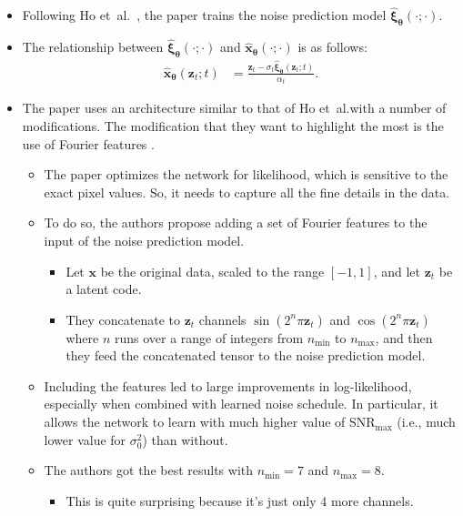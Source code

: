\documentclass[10pt]{article}
\newcommand{\ve}[1]{\mathbf{#1}}
\newcommand{\ves}[1]{\boldsymbol{#1}}
\newcommand{\etal}{{et~al.}}
\newcommand{\SNR}{\mathrm{SNR}}
\begin{document}
\begin{itemize}
  \item Following Ho \etal~\cite{Ho:2020}, the paper trains the noise prediction model $\hat{\ves{\xi}}_{\ves{\theta}}(\cdot; \cdot)$.
  
  \item The relationship between $\hat{\ves{\xi}}_{\ves{\theta}}(\cdot; \cdot)$ and $\hat{\ve{x}}_{\ves{\theta}}(\cdot; \cdot)$ is as follows:
  \begin{align*}
    \hat{\ve{x}}_{\ves{\theta}}(\ve{z}_t; t)
    &= \frac{\ve{z}_t - \sigma_t \hat{\ves{\xi}}_{\ves{\theta}}(\ve{z}_t; t) }{\alpha_t}.
  \end{align*}

  \item The paper uses an architecture similar to that of Ho \etal with a number of modifications. The modification that they want to highlight the most is the use of Fourier features \cite{Tancik:2020}.
  \begin{itemize}
    \item The paper optimizes the network for likelihood, which is sensitive to the exact pixel values. So, it needs to capture all the fine details in the data.
    
    \item To do so, the authors propose adding a set of Fourier features to the input of the noise prediction model.
    \begin{itemize}
      \item Let $\ve{x}$ be the original data, scaled to the range $[-1,1]$, and let $\ve{z}_t$ be a latent code. 
      
      \item They concatenate to $\ve{z}_t$ channels $\sin(2^n \pi \ve{z}_t)$ and $\cos(2^n \pi \ve{z}_t)$ where $n$ runs over a range of integers from $n_{\min}$ to $n_{\max}$, and then they feed the concatenated tensor to the noise prediction model.
    \end{itemize}
    
    \item Including the features led to large improvements in log-likelihood, especially when combined with learned noise schedule. In particular, it allows the network to learn with much higher value of $\SNR_{\max}$ (i.e., much lower value for $\sigma_0^2$) than without.
    
    \item The authors got the best results with $n_{\min} = 7$ and $n_{\max} = 8$.
    \begin{itemize}
      \item This is quite surprising because it's just only 4 more channels.
      

\end{itemize}
\end{itemize}
\end{itemize}
\end{document}
